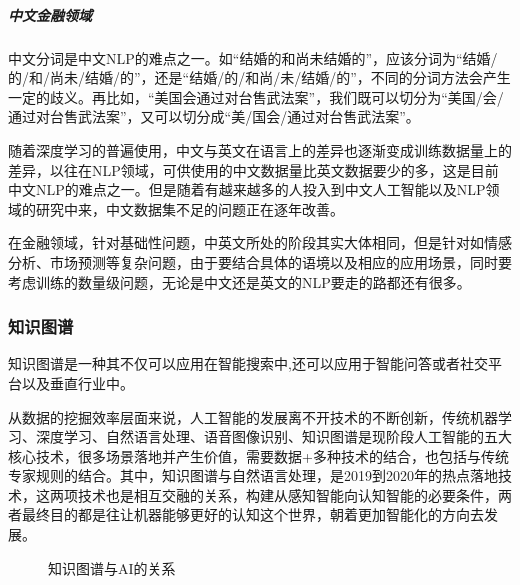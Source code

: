 \documentclass[letterpaper,10pt,english]{sphinxmanual}
\begin{document}
\subparagraph{中文金融领域}
\label{\detokenize{chapter_AI_dive/NLP:id20}}
中文分词是中文NLP的难点之一。如“结婚的和尚未结婚的”，应该分词为“结婚/的/和/尚未/结婚/的”，还是“结婚/的/和尚/未/结婚/的”，不同的分词方法会产生一定的歧义。再比如，“美国会通过对台售武法案”，我们既可以切分为“美国/会/通过对台售武法案”，又可以切分成“美/国会/通过对台售武法案”。

随着深度学习的普遍使用，中文与英文在语言上的差异也逐渐变成训练数据量上的差异，以往在NLP领域，可供使用的中文数据量比英文数据要少的多，这是目前中文NLP的难点之一。但是随着有越来越多的人投入到中文人工智能以及NLP领域的研究中来，中文数据集不足的问题正在逐年改善。

在金融领域，针对基础性问题，中英文所处的阶段其实大体相同，但是针对如情感分析、市场预测等复杂问题，由于要结合具体的语境以及相应的应用场景，同时要考虑训练的数量级问题，无论是中文还是英文的NLP要走的路都还有很多。%
\begin{footnote}[957]\sphinxAtStartFootnote
{}
%
\end{footnote}


\subsubsection{知识图谱}
\label{\detokenize{chapter_AI_dive/KG:id1}}\label{\detokenize{chapter_AI_dive/KG::doc}}
知识图谱是一种其不仅可以应用在智能搜索中,还可以应用于智能问答或者社交平台以及垂直行业中。

从数据的挖掘效率层面来说，人工智能的发展离不开技术的不断创新，传统机器学习、深度学习、自然语言处理、语音图像识别、知识图谱是现阶段人工智能的五大核心技术，很多场景落地并产生价值，需要数据+多种技术的结合，也包括与传统专家规则的结合。其中，知识图谱与自然语言处理，是2019到2020年的热点落地技术，这两项技术也是相互交融的关系，构建从感知智能向认知智能的必要条件，两者最终目的都是往让机器能够更好的认知这个世界，朝着更加智能化的方向去发展。%
\begin{footnote}[958]\sphinxAtStartFootnote
{}
%
\end{footnote}

\begin{figure}[H]
\centering
\capstart

\noindent{}
\caption{知识图谱与AI的关系}\label{\detokenize{chapter_AI_dive/KG:id5}}\end{figure}
\end{document}
